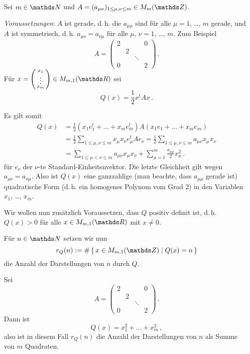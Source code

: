 Sei $m\in\NN$ und $A = ( a_{\mu\nu})_{1\leq\mu,\nu\leq m} \in M_{m}(\ZZ)$.

\emph{Voraussetzungen}: $A$ ist gerade, d.\,h. die $a_{\mu\mu}$ sind für alle $\mu = 1$, \ldots, $m$ gerade, und $A$ ist symmetrisch, d.\,h. $a_{\mu\nu} = a_{\nu\mu}$ für alle $\mu$, $\nu = 1$, \ldots, $m$.
Zum Beispiel
\[
	A =
	\begin{pmatrix}
	2 & & & 0 \\
	& 2 \\
	& & \ddots \\
	0 & & & 2
	\end{pmatrix}
	\,.
\]
Für $x = \left(\begin{smallmatrix}x_1 \\ \vdots \\ x_m\end{smallmatrix}\right) \in M_{m,1}(\RR)$ sei
\[
	Q(x)
	= \frac{1}{2} x^t A x
	\,.
\]

Es gilt somit
\begin{align*}
	Q(x)
	&= \frac{1}{2} (x_1e_1^t + \ldots + x_me_m^t) A (x_1e_1 + \ldots + x_me_m) \\
	&= \frac{1}{2} \sum_{1\leq\mu,\nu\leq m} x_\mu x_\nu e_\mu^t A e_\nu
	= \frac{1}{2} \sum_{1\leq\mu,\nu\leq m} a_{\mu\nu}x_\mu x_\nu \\
	&= \sum_{1\leq \mu < \nu \leq m} a_{\mu\nu}x_\mu x_\nu + \sum_{\mu=1}^m \frac{a_{\mu\mu}}{2} x_\mu^2
	\,.
\end{align*}
für $e_\nu$ der $\nu$-te Standard-Einheitsnvektor.
Die letzte Gleichheit gilt wegen $a_{\mu\nu} = a_{\nu\mu}$.
Also ist $Q(x)$ eine ganzzahlige (man beachte, dass $a_{\mu\mu}$ gerade ist) quadratische Form (d.\,h. ein homogenes Polynom vom Grad 2) in den Variablen $x_1$, \ldots, $x_m$.

Wir wollen nun zusätzlich Voraussetzen, dass $Q$ positiv definit ist, d.\,h. $Q(x) > 0$ für alle $x \in M_{m,1}(\RR)$ mit $x\not=0$.

Für $n\in\NN$ setzen wir nun
\[
	r_Q(n)
	:= \# \Set{x \in M_{m,1}(\ZZ) \mid Q(x) = n}
\]
die Anzahl der Darstellungen von $n$ durch $Q$.
\begin{bsp}
Sei
\[
	A =
	\begin{pmatrix}
	2 & & & 0 \\
	& 2 \\
	& & \ddots \\
	0 & & & 2
	\end{pmatrix}
	\,.
\]
Dann ist
\[
	Q(x) = x_1^2 + \ldots + x_m^2
	\,,
\]
also ist in diesem Fall $r_Q(n)$ die Anzahl der Darstellungen von $n$ als Summe von $m$ Quadraten.
\end{bsp}

